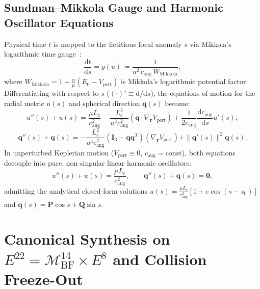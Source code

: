 \documentclass[11pt,a4paper,reqno]{article}
\theoremstyle{plain}
\theoremstyle{definition}
\theoremstyle{remark}
\numberwithin{equation}{section}
\begin{document}
\subsection{Sundman--Mikkola Gauge and Harmonic Oscillator Equations}
Physical time $t$ is mapped to the fictitious focal anomaly $s$ via Mikkola's logarithmic time gauge~\cite{mikkola1999}:
\begin{equation}
  \frac{\mathrm{d}t}{\mathrm{d}s} = g(u) \coloneqq \frac{1}{u^2 \, c_{\mathrm{ang}} \, W_{\mathrm{Mikkola}}},
  \label{eq:sundman_mikkola}
\end{equation}
where $W_{\mathrm{Mikkola}} = 1 + \frac{\alpha}{\mu} (E_0 - V_{\mathrm{pert}})$ is Mikkola's logarithmic potential factor. Differentiating with respect to $s$ ($(\cdot)' \equiv \mathrm{d}/\mathrm{d}s$), the equations of motion for the radial metric $u(s)$ and spherical direction $\bm{q}(s)$ become:
\begin{equation}
  u''(s) + u(s) = \frac{\mu L_c}{c_{\mathrm{ang}}^2} - \frac{L_c^3}{u^3 c_{\mathrm{ang}}^2} \left( \bm{q} \cdot \nabla_{\bm{r}} V_{\mathrm{pert}} \right) + \frac{1}{2 c_{\mathrm{ang}}} \frac{\mathrm{d} c_{\mathrm{ang}}}{\mathrm{d}s} u'(s),
  \label{eq:u_harmonic}
\end{equation}
\begin{equation}
  \bm{q}''(s) + \bm{q}(s) = - \frac{L_c^2}{u^4 c_{\mathrm{ang}}^2} (\mathbf{I}_3 - \bm{q} \bm{q}^T) \left( \nabla_{\bm{r}} V_{\mathrm{pert}} \right) + \|\bm{q}'(s)\|^2 \bm{q}(s).
  \label{eq:q_harmonic}
\end{equation}
In unperturbed Keplerian motion ($V_{\mathrm{pert}} \equiv 0$, $c_{\mathrm{ang}} = \mathrm{const}$), both equations decouple into pure, non-singular linear harmonic oscillators:
\begin{equation}
  u''(s) + u(s) = \frac{\mu L_c}{c_{\mathrm{ang}}^2}, \qquad \bm{q}''(s) + \bm{q}(s) = \bm{0},
\end{equation}
admitting the analytical closed-form solutions $u(s) = \frac{\mu L_c}{c_{\mathrm{ang}}^2} [1 + e \cos(s - s_0)]$ and $\bm{q}(s) = \bm{P} \cos s + \bm{Q} \sin s$.

\section{Canonical Synthesis on \texorpdfstring{$E^{22} = \mathcal{M}_{\mathrm{BF}}^{14} \times E^8$}{E22 = M BF 14 x E8} and Collision Freeze-Out}
\label{sec:synthesis_freezeout}
\end{document}
